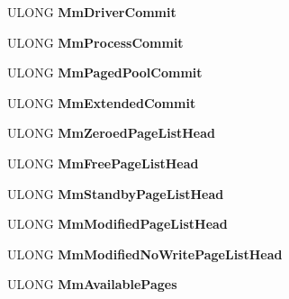 \begin{DoxyCompactItemize}
U\+L\+O\+NG {\bfseries Mm\+Driver\+Commit}
\item 
\mbox{\label{struct___k_d_d_e_b_u_g_g_e_r___d_a_t_a32_a5457130bbba80489cab2052d625240ec}} 
U\+L\+O\+NG {\bfseries Mm\+Process\+Commit}
\item 
\mbox{\label{struct___k_d_d_e_b_u_g_g_e_r___d_a_t_a32_a09551072d8e00c2ebcacf5118cdb6cc3}} 
U\+L\+O\+NG {\bfseries Mm\+Paged\+Pool\+Commit}
\item 
\mbox{\label{struct___k_d_d_e_b_u_g_g_e_r___d_a_t_a32_afeb02fc44958772623224de16be37873}} 
U\+L\+O\+NG {\bfseries Mm\+Extended\+Commit}
\item 
\mbox{\label{struct___k_d_d_e_b_u_g_g_e_r___d_a_t_a32_afd2b80b549aa6534b005f9731a0eccad}} 
U\+L\+O\+NG {\bfseries Mm\+Zeroed\+Page\+List\+Head}
\item 
\mbox{\label{struct___k_d_d_e_b_u_g_g_e_r___d_a_t_a32_a347b949b3e3d9858af71734428df1527}} 
U\+L\+O\+NG {\bfseries Mm\+Free\+Page\+List\+Head}
\item 
\mbox{\label{struct___k_d_d_e_b_u_g_g_e_r___d_a_t_a32_a351c007a7ad0867cd8a0ce1a820308d3}} 
U\+L\+O\+NG {\bfseries Mm\+Standby\+Page\+List\+Head}
\item 
\mbox{\label{struct___k_d_d_e_b_u_g_g_e_r___d_a_t_a32_a0ad6b276ccf17840df567f8fc8b1b175}} 
U\+L\+O\+NG {\bfseries Mm\+Modified\+Page\+List\+Head}
\item 
\mbox{\label{struct___k_d_d_e_b_u_g_g_e_r___d_a_t_a32_aaa69146dcfd6f610b60c8b4b6588d02f}} 
U\+L\+O\+NG {\bfseries Mm\+Modified\+No\+Write\+Page\+List\+Head}
\item 
\mbox{\label{struct___k_d_d_e_b_u_g_g_e_r___d_a_t_a32_a17669ddeb521243035e5325957cded04}} 
U\+L\+O\+NG {\bfseries Mm\+Available\+Pages}
\item 
\mbox{\label{struct___k_d_d_e_b_u_g_g_e_r___d_a_t_a32_ab717cb5d0cccf7c3ba2b644bfa438ec9}} 

\end{DoxyCompactItemize}
